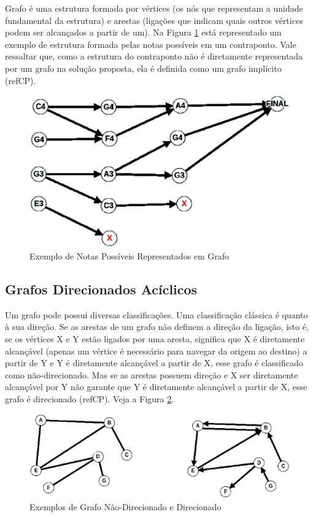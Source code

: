     Grafo é uma estrutura formada por vértices (os nós que representam a unidade fundamental da estrutura) e arestas (ligações que indicam quais outros vértices podem ser alcançados a partir de um). Na Figura \ref{grafonotas} está representado um exemplo de estrutura formada pelas notas possíveis em um contraponto. Vale ressaltar que, como a estrutura do contraponto não é diretamente representada por um grafo na solução proposta, ela é definida como um grafo implícito (refCP).

    \begin{figure}[htb]
      \centering
      \includegraphics[scale=0.55]{figuras/grafonotas.eps}
      \caption{Exemplo de Notas Possíveis Representados em Grafo}
      \label{grafonotas}
    \end{figure}

    \subsection[Grafos Direcionados Acíclicos]{Grafos Direcionados Acíclicos}

      Um grafo pode possui diversas classificações. Uma classificação clássica é quanto à sua direção. Se as arestas de um grafo não definem a direção da ligação, isto é, se os vértices X e Y estão ligados por uma aresta, significa que X é diretamente alcançável (apenas um vértice é necessário para navegar da origem ao destino) a partir de Y e Y é diretamente alcançável a partir de X, esse grafo é classificado como não-direcionado. Mas se as arestas possuem direção e X ser diretamente alcançável por Y não garante que Y é diretamente alcançável a partir de X, esse grafo é direcionado (refCP). Veja a Figura \ref{nodirxdir}.

      \begin{figure}[htb]
        \centering
        \includegraphics[scale=0.47]{figuras/nodirxdir.eps}
        \caption{Exemplos de Grafo Não-Direcionado e Direcionado}
        \label{nodirxdir}
      \end{figure}

